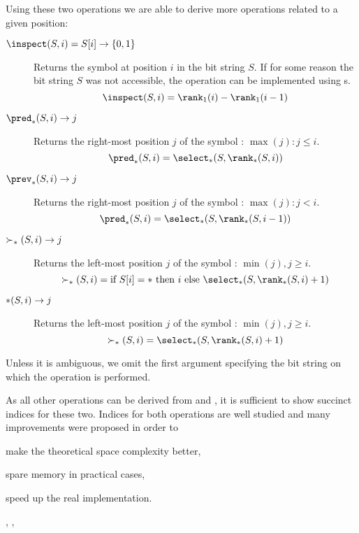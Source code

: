 Using these two operations we are able to derive more operations related to a given position:
\begin{description}
	\item[$\inspect(S, i) = S[i\char93 \rightarrow \{0, 1\}$]
	Returns the symbol at position $i$ in the bit string $S$.
	If for some reason the bit string $S$ was not accessible, the operation can be implemented using \rank{}s.
	$$ \inspect(S, i) = \rank_1(i) - \rank_1(i - 1) $$

	\item[$\pred_{\ph}(S, i) \rightarrow j$]
	Returns the right-most position $j$ of the symbol \ph{}: $\max(j) : j \le i$.
	$$ \pred_{\ph}(S, i) = \select_{\ph}(S, \rank_{\ph}(S, i)) $$
	
	\item[$\prev_{\ph}(S, i) \rightarrow j$]
	Returns the right-most position $j$ of the symbol \ph{}: $\max(j) : j < i$.
	$$ \pred_{\ph}(S, i) = \select_{\ph}(S, \rank_{\ph}(S, i - 1)) $$

	\item[$\succ_{\ph}(S, i) \rightarrow j$]
	Returns the left-most position $j$ of the symbol \ph{}: $\min(j), j \ge i$.
	$$ \succ_{\ph}(S, i) = \textrm{if}\ S[i] = \ph\ \textrm{then}\ i \ \textrm{else}\ \select_{\ph}(S, \rank_{\ph}(S, i) + 1) $$

	\item[$\next_{\ph}(S, i) \rightarrow j$]
	Returns the left-most position $j$ of the symbol \ph{}: $\min(j), j \ge i$.
	$$ \succ_{\ph}(S, i) = \select_{\ph}(S, \rank_{\ph}(S, i) + 1) $$
\end{description}

Unless it is ambiguous, we omit the first argument specifying the bit string on which the operation is performed.

\bigbreak

As all other operations can be derived from \rank{} and \select{}, it is sufficient to show succinct indices for these two.
Indices for both operations are well studied and many improvements were proposed in order to
\begin{iteminline}
	\item make the theoretical space complexity better,
	\item spare memory in practical cases,
	\item speed up the real implementation.
\end{iteminline}
\cite{gonzalez2005practical}, \cite{kim2005efficient}, \cite{makinen2007rank}

